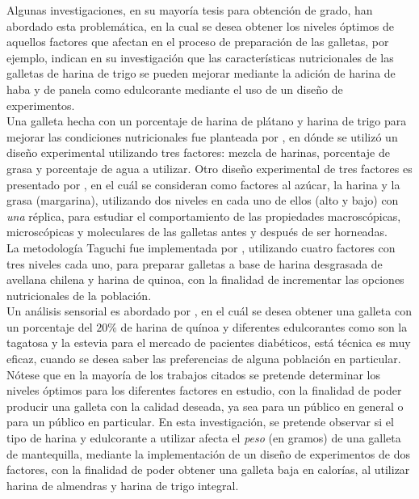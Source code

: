 \documentclass[spanish,letterpaper,12pt]{article}
\begin{document}
Algunas investigaciones, en su mayoría tesis para obtención de grado, han abordado esta problemática, en la cual se desea obtener los niveles óptimos de aquellos factores que afectan en el proceso de preparación de las galletas, por ejemplo, \citet{arevalo2011} indican en su investigación que las características nutricionales de las galletas de harina de trigo se pueden mejorar mediante la adición de harina de haba  y de panela como edulcorante mediante el uso de un diseño de experimentos.\\

Una galleta hecha con un porcentaje de harina de plátano y harina de trigo para mejorar las condiciones nutricionales fue planteada por \citet{loaiza2017}, en dónde se utilizó un diseño experimental utilizando tres factores: mezcla de harinas, porcentaje de grasa y porcentaje de agua a utilizar. Otro diseño experimental de tres factores es presentado por \citet{cardenas2015}, en el cuál se consideran como factores al azúcar, la harina y la grasa (margarina), utilizando dos niveles en cada uno de ellos (alto y bajo) con \emph{una} réplica, para estudiar el comportamiento de las propiedades macroscópicas, microscópicas y moleculares de las galletas antes y después de ser horneadas.\\

La metodología Taguchi fue implementada por \citet{villarroel2009}, utilizando cuatro factores con tres niveles cada uno, para preparar galletas a base de harina desgrasada de avellana chilena y harina de quinoa, con la finalidad de incrementar las opciones nutricionales de la población.\\

Un análisis sensorial es abordado por \citet{martinez2016}, en el cuál se desea obtener una galleta con un porcentaje del $20\%$ de harina de quínoa y diferentes edulcorantes como son la tagatosa y la estevia para el mercado de pacientes diabéticos, está técnica es muy eficaz, cuando se desea saber las preferencias de alguna población en particular.\\

Nótese que en la mayoría de los trabajos citados se pretende determinar los niveles óptimos para los diferentes factores en estudio, con la finalidad de poder producir una galleta con la calidad deseada, ya sea para un público en general o para un público en particular. En esta investigación, se pretende observar si el tipo de harina y edulcorante a utilizar afecta el \emph{peso} (en gramos) de una galleta de mantequilla, mediante la implementación de un diseño de experimentos de dos factores, con la finalidad de poder obtener una galleta baja en calorías, al utilizar harina de almendras y harina de trigo integral.\\
\end{document}
